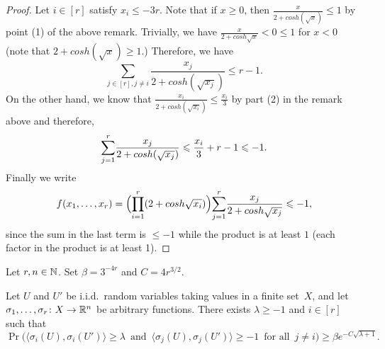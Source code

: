 \begin{proof}
  Let $i \in [r]$ satisfy $x_i \leq -3r$. Note that if $x\geq 0$, then $\frac{x}{2+cosh(\sqrt{x})}\leq 1$ by point (1) of the above remark.
  Trivially, we have $\frac{x}{2+cosh{\sqrt{x}}}<0\leq 1$ for $x<0$ (note that $2+cosh(\sqrt{x})\geq 1$.)
  Therefore, we have 
  \begin{equation*}
  \underset{j \in [r], j \neq i}{\sum} \frac{x_j}{2+cosh(\sqrt{x_j})} \leq r-1.
  \end{equation*}
  On the other hand, we know that $\frac{x_i}{2+cosh(\sqrt{x_i})} \leq \frac{x_i}{3}$ by part (2) in the remark above and therefore,
\begin{equation*}
\overunderset{r}{j=1}{\sum}\frac{x_j}{2+cosh(\sqrt{x_j})}\leq \frac{x_i}{3}+r-1\leq -1.
\end{equation*}
Finally we write 
\begin{equation*}
  f(x_1,\dots,x_r) = \Bigl(\overunderset{r}{i=1}{\prod}(2+cosh\sqrt{x_i})\Bigr)\overunderset{r}{j=1}{\sum}\frac{x_j}{2+cosh \sqrt{x_j}} \leq -1,
\end{equation*}
since the sum in the last term is $\leq -1$ while the product is at least $1$ (each factor in the product is at least 1).
\end{proof}
\begin{lemma}
  \label{lem:geometric}
  Let $r, n\in\mathbb{N}$. Set $\beta = 3^{-4r}$ and $C = 4r^{3/2}$.

  Let\/ $U$ and\/ $U'$ be i.i.d.~random variables taking values in a finite set~$X$, and let $\sigma_1,\ldots,\sigma_r \colon X \rightarrow \mathbb{R}^n$ be arbitrary functions. There exists $\lambda\ge-1$ and\/ $i\in[r]$ such that
  $$\Pr\Big( \big\langle \sigma_i(U),\sigma_i(U') \big\rangle \ge \lambda \, \text{ and } \, \big\langle \sigma_j(U), \sigma_j(U') \big\rangle \ge -1 \, \text{ for all } \, j \ne i \Big) \ge \beta e^{- C\sqrt{\lambda + 1}}.$$
\end{lemma}

